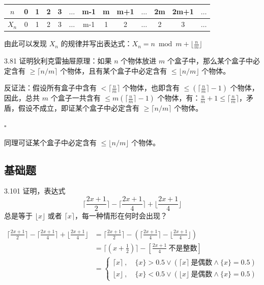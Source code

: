 \begin{table}[ht]
  \centering
  {\color{grayblack}
    \begin{tabular}{c|c|c|c|c|c|c|c|c|c|c|c|c}
      \toprule
      \( n \) & 0 & 1 & 2 & 3 & \( \dots \) & m-1 & m & m+1 & \( \dots \) & 2m & 2m+1 & \( \dots \) \\
      \midrule
      \( X_n \) & 0 & 1 & 2 & 3 & \( \dots \) & m-1 & 1 & 2 & \( \dots \) & 2 & 3 & \( \dots \) \\
      \bottomrule
  \end{tabular}}
\end{table}

由此可以发现 \( X_n \) 的规律并写出表达式：\( X_n = n \bmod m + \lfloor \frac{n}{m} \rfloor \)

\begin{problem}{3.8}{1}
  证明狄利克雷抽屉原理：如果 \( n \) 个物体放进 \( m \) 个盒子中，那么某个盒子中必定含有 \( \ge \lceil n/m \rceil \) 个物体，且有某个盒子中必定含有 \( \le \lfloor n/m \rfloor \) 个物体。
\end{problem}

反证法：假设所有盒子中含有 \( < \lceil \frac{n}{m} \rceil \) 个物体，也即含有 \( \le ( \lceil \frac{n}{m} \rceil - 1) \) 个物体，因此，总共 \( m \) 个盒子一共含有 \( \le m (\lceil \frac{n}{m} \rceil - 1) \) 个物体，有：\( \frac{n}{m} + 1 \le \lceil \frac{n}{m} \rceil \)，矛盾，假设不成立，即证某个盒子中必定含有 \( \ge \lceil n/m \rceil \) 个物体。

\hfill \( \square \)

同理可证某个盒子中必定含有 \( \le \lfloor n/m \rfloor \) 个物体。

\subsection{基础题}

\begin{problem}{3.10}{1}
  证明，表达式
  \[
    \lceil \frac{2x+1}{2} \rceil - \lceil \frac{2x+1}{4} \rceil + \lfloor \frac{2x+1}{4} \rfloor
  \]
  总是等于 \( \lfloor x \rfloor \) 或者 \( \lceil x \rceil \)，每一种情形在何时会出现？
\end{problem}

\begin{align*}
  \lceil \frac{2x+1}{2} \rceil - \lceil \frac{2x+1}{4} \rceil + \lfloor \frac{2x+1}{4} \rfloor & = \lceil \frac{2x+1}{2} \rceil - ( \lceil \frac{2x+1}{4} \rceil - \lfloor \frac{2x+1}{4} \rfloor) \\
  & = \lceil (x + \frac{1}{2}) \rceil - [\frac{2x+1}{4} \ \text{不是整数}] \\
  & =
  \begin{cases}
    \lceil x \rceil \ , \quad \{x\} > 0.5 \lor (\lceil x \rceil \ \text{是偶数} \land \{x \} = 0.5)\\
    \lfloor x \rfloor \ , \quad \{x\} < 0.5 \lor (\lfloor x \rfloor \ \text{是偶数} \land \{x \} = 0.5)
  \end{cases}
\end{align*}


